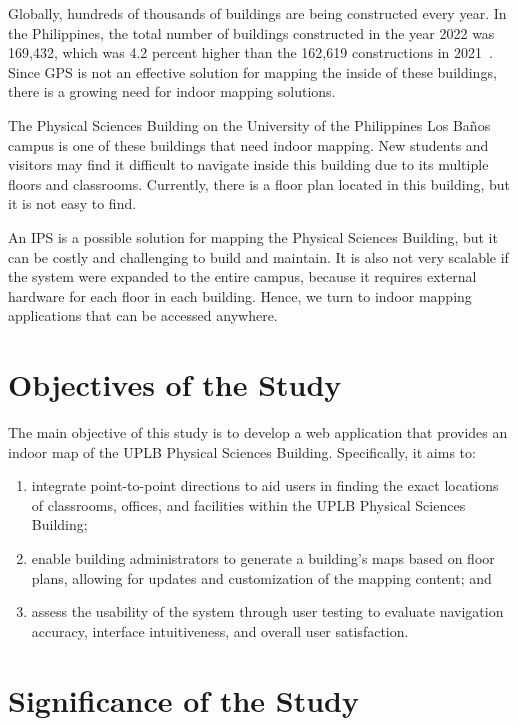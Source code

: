 Globally, hundreds of thousands of buildings are being constructed every year.
In the Philippines, the total number of buildings constructed in the year 2022
was 169,432, which was 4.2 percent higher than the 162,619 constructions in
2021~\cite{ref02}. Since GPS is not an effective solution for mapping the inside
of these buildings, there is a growing need for indoor mapping solutions.

The Physical Sciences Building on the University of the Philippines Los Baños
campus is one of these buildings that need indoor mapping. New students and
visitors may find it difficult to navigate inside this building due to its
multiple floors and classrooms. Currently, there is a floor plan located in this
building, but it is not easy to find.

An IPS is a possible solution for mapping the Physical Sciences Building, but it
can be costly and challenging to build and maintain. It is also not very
scalable if the system were expanded to the entire campus, because it requires
external hardware for each floor in each building. Hence, we turn to indoor
mapping applications that can be accessed anywhere.

\section{Objectives of the Study}\label{sec:1.3}

The main objective of this study is to develop a web application that provides
an indoor map of the UPLB Physical Sciences Building. Specifically, it aims to:

\begin{enumerate}
\def\labelenumi{\arabic{enumi}.}
\item
  integrate point-to-point directions to aid users in finding the exact
  locations of classrooms, offices, and facilities within the UPLB Physical
  Sciences Building;
\item
  enable building administrators to generate a building's maps based on floor
  plans, allowing for updates and customization of the mapping content; and
\item
  assess the usability of the system through user testing to evaluate navigation
  accuracy, interface intuitiveness, and overall user satisfaction.
\end{enumerate}

\section{Significance of the Study}\label{sec:1.4}

